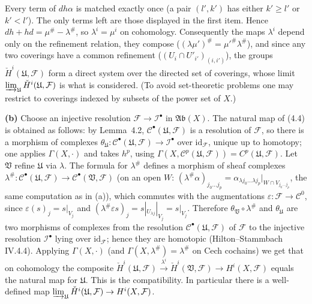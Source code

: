 \documentclass[11pt]{article}
\begin{document}
Every term of $dh\alpha$ is matched exactly once (a pair $(l',k')$ has either $k'\ge l'$ or $k'<l'$). The only terms left are those displayed in the first item. Hence $dh+hd=\mu^\#-\lambda^\#$, so $\lambda^i=\mu^i$ on cohomology. Consequently the maps $\lambda^i$ depend only on the refinement relation, they compose ($(\lambda\mu')^\#=\mu'^\#\lambda^\#$), and since any two coverings have a common refinement ($(U_i\cap U'_{i'})_{(i,i')}$), the groups $\check H^i(\mathfrak U,\mathcal F)$ form a direct system over the directed set of coverings, whose limit $\varinjlim_{\mathfrak U}\check H^i(\mathfrak U,\mathcal F)$ is what is considered. (To avoid set-theoretic problems one may restrict to coverings indexed by subsets of the power set of $X$.)

\textbf{(b)} Choose an injective resolution $\mathcal F\to\mathcal I^\bullet$ in $\mathfrak{Ab}(X)$. The natural map of (4.4) is obtained as follows: by Lemma~4.2, $\mathcal C^\bullet(\mathfrak U,\mathcal F)$ is a resolution of $\mathcal F$, so there is a morphism of complexes $\theta_{\mathfrak U}:\mathcal C^\bullet(\mathfrak U,\mathcal F)\to\mathcal I^\bullet$ over $\mathrm{id}_{\mathcal F}$, unique up to homotopy; one applies $\Gamma(X,\cdot)$ and takes $h^p$, using $\Gamma(X,\mathcal C^p(\mathfrak U,\mathcal F))=C^p(\mathfrak U,\mathcal F)$. Let $\mathfrak V$ refine $\mathfrak U$ via $\lambda$. The formula for $\lambda^\#$ defines a morphism of sheaf complexes $\lambda^\#:\mathcal C^\bullet(\mathfrak U,\mathcal F)\to\mathcal C^\bullet(\mathfrak V,\mathcal F)$ (on an open $W$: $(\lambda^\#\alpha)_{j_0\dots j_p}=\alpha_{\lambda j_0\dots\lambda j_p}|_{W\cap V_{j_0\dots j_p}}$, the same computation as in (a)), which commutes with the augmentations $\varepsilon:\mathcal F\to\mathcal C^0$, since $\varepsilon(s)_j=s|_{V_j}$ and $(\lambda^\#\varepsilon s)_j=s|_{U_{\lambda j}}|_{V_j}=s|_{V_j}$. Therefore $\theta_{\mathfrak V}\circ\lambda^\#$ and $\theta_{\mathfrak U}$ are two morphisms of complexes from the resolution $\mathcal C^\bullet(\mathfrak U,\mathcal F)$ of $\mathcal F$ to the injective resolution $\mathcal I^\bullet$ lying over $\mathrm{id}_{\mathcal F}$; hence they are homotopic (Hilton--Stammbach IV.4.4). Applying $\Gamma(X,\cdot)$ (and $\Gamma(X,\lambda^\#)=\lambda^\#$ on Cech cochains) we get that on cohomology the composite $\check H^i(\mathfrak U,\mathcal F)\xrightarrow{\lambda^i}\check H^i(\mathfrak V,\mathcal F)\to H^i(X,\mathcal F)$ equals the natural map for $\mathfrak U$. This is the compatibility. In particular there is a well-defined map $\varinjlim_{\mathfrak U}\check H^i(\mathfrak U,\mathcal F)\to H^i(X,\mathcal F)$.
\end{document}
